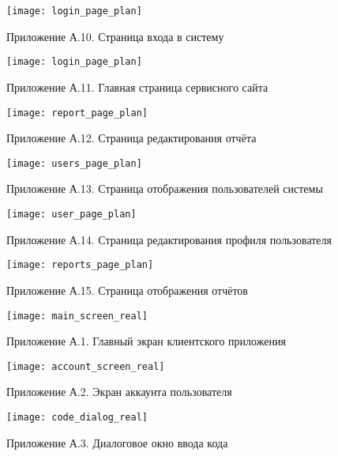 \begin{figure}[!htbp]
	\texttt{[image: login\_page\_plan]}
	\centering
	\caption*{Приложение А.10. Страница входа в систему}
\end{figure}

\begin{figure}[!htbp]
	\texttt{[image: login\_page\_plan]}
	\centering
	\caption*{Приложение А.11. Главная страница сервисного сайта}
\end{figure}

\begin{figure}[!htbp]
	\texttt{[image: report\_page\_plan]}
	\centering
	\caption*{Приложение А.12. Страница редактирования отчёта}
\end{figure}

\begin{figure}[!htbp]
	\texttt{[image: users\_page\_plan]}
	\centering
	\caption*{Приложение А.13. Страница отображения пользователей системы}
\end{figure}

\begin{figure}[!htbp]
	\texttt{[image: user\_page\_plan]}
	\centering
	\caption*{Приложение А.14. Страница редактирования профиля пользователя}
\end{figure}

\begin{figure}[!htbp]
	\texttt{[image: reports\_page\_plan]}
	\centering
	\caption*{Приложение А.15. Страница отображения отчётов}
\end{figure}

\cleardoublepage


\begin{figure}[!htbp]
	\texttt{[image: main\_screen\_real]}
	\centering
	\caption*{Приложение А.1. Главный экран клиентского приложения}
\end{figure}

\begin{figure}[!htbp]
	\texttt{[image: account\_screen\_real]}
	\centering
	\caption*{Приложение А.2. Экран аккаунта пользователя}
\end{figure}

\begin{figure}[!htbp]
	\texttt{[image: code\_dialog\_real]}
	\centering
	\caption*{Приложение А.3. Диалоговое окно ввода кода}
\end{figure}


